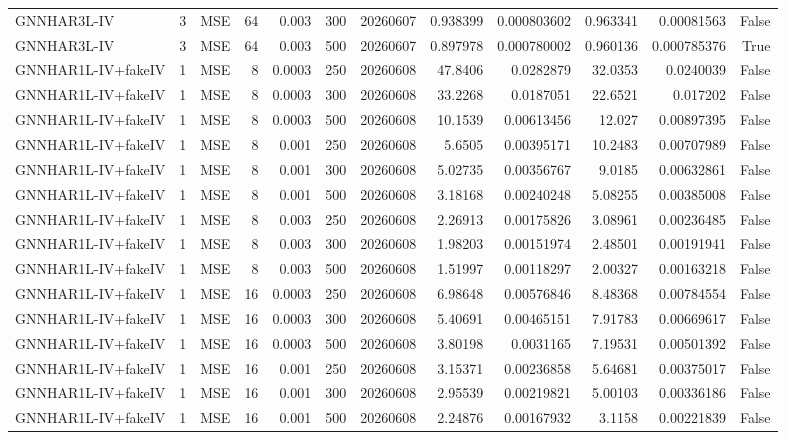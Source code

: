 \begin{tabular}{lrlrrrrrrrrr}
GNNHAR3L-IV & 3 & MSE & 64 & 0.003 & 300 & 20260607 & 0.938399 & 0.000803602 & 0.963341 & 0.00081563 & False \\
GNNHAR3L-IV & 3 & MSE & 64 & 0.003 & 500 & 20260607 & 0.897978 & 0.000780002 & 0.960136 & 0.000785376 & True \\
GNNHAR1L-IV+fakeIV & 1 & MSE & 8 & 0.0003 & 250 & 20260608 & 47.8406 & 0.0282879 & 32.0353 & 0.0240039 & False \\
GNNHAR1L-IV+fakeIV & 1 & MSE & 8 & 0.0003 & 300 & 20260608 & 33.2268 & 0.0187051 & 22.6521 & 0.017202 & False \\
GNNHAR1L-IV+fakeIV & 1 & MSE & 8 & 0.0003 & 500 & 20260608 & 10.1539 & 0.00613456 & 12.027 & 0.00897395 & False \\
GNNHAR1L-IV+fakeIV & 1 & MSE & 8 & 0.001 & 250 & 20260608 & 5.6505 & 0.00395171 & 10.2483 & 0.00707989 & False \\
GNNHAR1L-IV+fakeIV & 1 & MSE & 8 & 0.001 & 300 & 20260608 & 5.02735 & 0.00356767 & 9.0185 & 0.00632861 & False \\
GNNHAR1L-IV+fakeIV & 1 & MSE & 8 & 0.001 & 500 & 20260608 & 3.18168 & 0.00240248 & 5.08255 & 0.00385008 & False \\
GNNHAR1L-IV+fakeIV & 1 & MSE & 8 & 0.003 & 250 & 20260608 & 2.26913 & 0.00175826 & 3.08961 & 0.00236485 & False \\
GNNHAR1L-IV+fakeIV & 1 & MSE & 8 & 0.003 & 300 & 20260608 & 1.98203 & 0.00151974 & 2.48501 & 0.00191941 & False \\
GNNHAR1L-IV+fakeIV & 1 & MSE & 8 & 0.003 & 500 & 20260608 & 1.51997 & 0.00118297 & 2.00327 & 0.00163218 & False \\
GNNHAR1L-IV+fakeIV & 1 & MSE & 16 & 0.0003 & 250 & 20260608 & 6.98648 & 0.00576846 & 8.48368 & 0.00784554 & False \\
GNNHAR1L-IV+fakeIV & 1 & MSE & 16 & 0.0003 & 300 & 20260608 & 5.40691 & 0.00465151 & 7.91783 & 0.00669617 & False \\
GNNHAR1L-IV+fakeIV & 1 & MSE & 16 & 0.0003 & 500 & 20260608 & 3.80198 & 0.0031165 & 7.19531 & 0.00501392 & False \\
GNNHAR1L-IV+fakeIV & 1 & MSE & 16 & 0.001 & 250 & 20260608 & 3.15371 & 0.00236858 & 5.64681 & 0.00375017 & False \\
GNNHAR1L-IV+fakeIV & 1 & MSE & 16 & 0.001 & 300 & 20260608 & 2.95539 & 0.00219821 & 5.00103 & 0.00336186 & False \\
GNNHAR1L-IV+fakeIV & 1 & MSE & 16 & 0.001 & 500 & 20260608 & 2.24876 & 0.00167932 & 3.1158 & 0.00221839 & False \\

\end{tabular}
